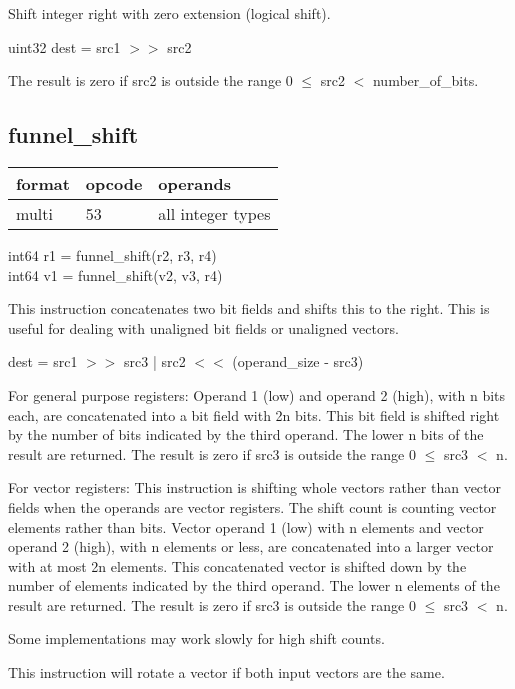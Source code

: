 \documentclass[forwardcom.tex]{subfiles}
\begin{document}
Shift integer right with zero extension (logical shift).
\vv

uint32 dest = src1 $>>$ src2
\vv

The result is zero if src2 is outside the range 0 $\leq$ src2 $<$ number\_of\_bits.
\vv


\subsection{funnel\_shift}
\label{table:funnelShiftInstruction}
\begin{tabular}{|p{12mm}|p{15mm}|p{100mm}|}
\hline
\bfseries format & \bfseries opcode & \bfseries operands \\ \hline
multi & 53 & all integer types \\ \hline
\end{tabular}
\vv

int64 r1 = funnel\_shift(r2, r3, r4) \\
int64 v1 = funnel\_shift(v2, v3, r4) \\
\vv

This instruction concatenates two bit fields and shifts this to the right. This is useful for dealing with unaligned bit fields or unaligned vectors.
\vv

dest = src1 $>>$ src3 | src2 $<<$ (operand\_size - src3)
\vv

For general purpose registers: Operand 1 (low) and operand 2 (high), with n bits each, are concatenated into a bit field with 2n bits. This bit field is shifted right by the number of bits indicated by the third operand. The lower n bits of the result are returned. The result is zero if src3 is outside the range 0 $\leq$ src3 $<$ n.
\vv

For vector registers: This instruction is shifting whole vectors rather than vector fields when the operands are vector registers. The shift count is counting vector elements rather than bits. 
Vector operand 1 (low) with n elements and vector operand 2 (high), with n elements or less, are concatenated into a larger vector with at most 2n elements. This concatenated vector is shifted down by the number of elements indicated by the third operand. The lower n elements of the result are returned. The result is zero if src3 is outside the range 0 $\leq$ src3 $<$ n.
\vv

Some implementations may work slowly for high shift counts. 
\vv

This instruction will rotate a vector if both input vectors are the same.
\vv
\end{document}
